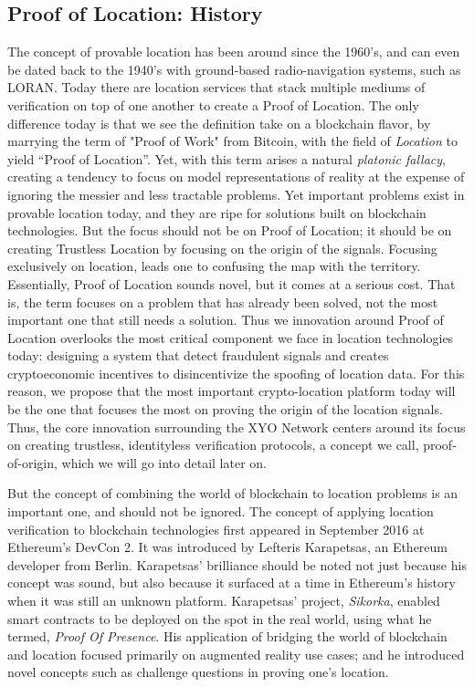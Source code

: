 \documentclass{article}
\begin{document}
\subsection {Proof of Location: History}
The concept of provable location has been around since the 1960's, and can even be dated back to the 1940's with ground-based radio-navigation systems, such as LORAN. Today there are location services that stack multiple mediums of verification on top of one another to create a Proof of Location. The only difference today is that we see the definition take on a  blockchain flavor, by marrying the term of "Proof of Work" from Bitcoin, with the field of \textit{Location} to yield ``Proof of Location''. Yet, with this term arises a natural \textit{platonic fallacy}, creating a tendency to focus on model representations of reality at the expense of ignoring the messier and less tractable problems. Yet important problems exist in provable location today, and they are ripe for solutions built on blockchain technologies. But the focus should not be on Proof of Location; it should be on creating Trustless Location by focusing on the origin of the signals. Focusing exclusively on location, leads one to confusing the map with the territory. Essentially, Proof of Location sounds novel, but it comes at a serious cost. That is, the term focuses on a problem that has already been solved, not the most important one that still needs a solution. Thus we innovation around Proof of Location overlooks the most critical component we face in location technologies today: designing a system that detect fraudulent signals and creates cryptoeconomic incentives to disincentivize the spoofing of location data. For this reason, we propose that the most important crypto-location platform today will be the one that focuses the most on proving the origin of the location signals. Thus, the core innovation surrounding the XYO Network centers around its focus on creating trustless, identityless verification protocols, a concept we call, \Gls{proof-of-origin}, which we will go into detail later on.

But the concept of combining the world of blockchain to location problems is an important one, and should not be ignored. The concept of applying location verification to blockchain technologies first appeared in September 2016 at Ethereum's DevCon 2. It was introduced by Lefteris Karapetsas, an Ethereum developer from Berlin. Karapetsas' brilliance should be noted not just because his concept was sound, but also because it surfaced at a time in Ethereum's history when it was still an unknown platform. Karapetsas' project, \textit{Sikorka}, enabled smart contracts to be deployed on the spot in the real world, using what he termed, \textit{Proof Of Presence}. His application of bridging the world of blockchain and location focused primarily on augmented reality use cases; and he introduced novel concepts such as challenge questions in proving one's location.
\end{document}
